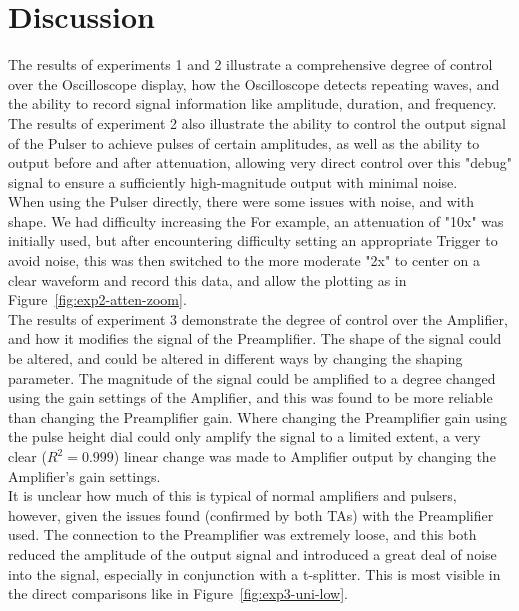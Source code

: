 \documentclass[12pt]{article}
\begin{document}
\section{Discussion}\label{sec:disc}
The results of experiments 1 and 2 illustrate a comprehensive degree of control over the Oscilloscope display, how the Oscilloscope detects repeating waves, and the ability to record signal information like amplitude, duration, and frequency.\\

The results of experiment 2 also illustrate the ability to control the output signal of the Pulser to achieve pulses of certain amplitudes, as well as the ability to output before and after attenuation, allowing very direct control over this "debug" signal to ensure a sufficiently high-magnitude output with minimal noise.\\

When using the Pulser directly, there were some issues with noise, and with shape.
We had difficulty increasing the 
For example, an attenuation of "10x" was initially used, but after encountering difficulty setting an appropriate Trigger to avoid noise, this was then switched to the more moderate "2x" to center on a clear waveform and record this data, and allow the plotting as in Figure~\ref{fig:exp2-atten-zoom}.\\

The results of experiment 3 demonstrate the degree of control over the Amplifier, and how it modifies the signal of the Preamplifier.
The shape of the signal could be altered, and could be altered in different ways by changing the shaping parameter.
The magnitude of the signal could be amplified to a degree changed using the gain settings of the Amplifier, and this was found to be more reliable
than changing the Preamplifier gain.
Where changing the Preamplifier gain using the pulse height dial could only amplify the signal to a limited extent, a very clear ($R^2=0.999$) linear change was made to Amplifier output by changing the Amplifier's gain settings. \\

It is unclear how much of this is typical of normal amplifiers and pulsers, however, given the issues found (confirmed by both TAs) with the Preamplifier used.
The connection to the Preamplifier was extremely loose, and this both reduced the amplitude of the output signal and introduced a great deal of noise into the signal, especially in conjunction with a t-splitter.
This is most visible in the direct comparisons like in Figure~\ref{fig:exp3-uni-low}.\\
\end{document}
